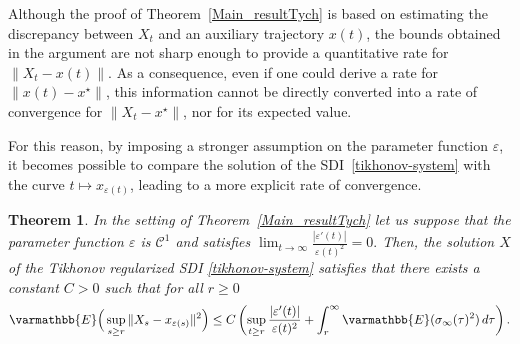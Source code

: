 \documentclass[11pt,reqno]{article}
\let\mathbb=\varmathbb
\renewcommand{\epsilon}{\varepsilon}
\newcommand{\1}{\mathds{1}}
\numberwithin{equation}{section}  %
\theoremstyle{plain}
\newtheorem{theorem}{Theorem}
\theoremstyle{definition}
\theoremstyle{remark}
\numberwithin{theorem}{section}
\numberwithin{remark}{section}
\numberwithin{example}{section}
\begin{document}
Although the proof of Theorem~\ref{Main_resultTych} is based on estimating the discrepancy between $X_t$ and an auxiliary trajectory $x(t)$, the bounds obtained in the argument are not sharp enough to provide a quantitative rate for $\|X_t-x(t)\|$. As a consequence, even if one could derive a rate for $\|x(t)-x^\star\|$, this information cannot be directly converted into a rate of convergence for $\|X_t-x^\star\|$, nor for its expected value.

For this reason, by imposing a stronger assumption on the parameter function $\epsilon$, it becomes possible to compare the solution of the SDI~\eqref{tikhonov-system} with the curve $t\mapsto x_{\epsilon(t)}$, leading to a more explicit rate of convergence.

\begin{theorem}\label{thm-tikhonov}
 In the setting of Theorem~\ref{Main_resultTych}  let us suppose that the parameter function $\epsilon$ is $\mathcal{C}^1$ and satisfies $\displaystyle\lim_{t\to \infty}  \frac{\left|\epsilon'(t) \right|}{\epsilon(t)^2} = 0.  $   Then, the   solution $X$ of the  Tikhonov regularized SDI \eqref{tikhonov-system} satisfies that there exists a constant $C >0$ such that for all $r \geq 0$
 \begin{align}\label{T01}
 \mathbb{E}\Big(\sup_{s\geq r}\|X_{s }-x_{\epsilon(s )}\|^2\Big) 
		\leq C \left( \sup_{t\geq r}\frac{|\epsilon'(t)|}{\epsilon(t)^2} + \int_{r}^\infty \mathbb{E}(\sigma_\infty(\tau)^2) \, d\tau \right).
 \end{align}
\end{theorem}
\end{document}
